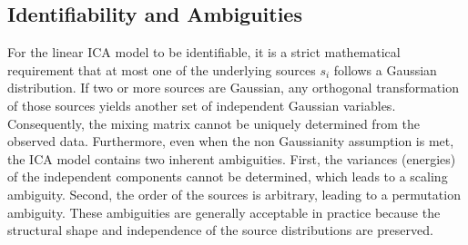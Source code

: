 \documentclass[12pt,a4paper,twoside,openany]{book}
\begin{document}
\subsection{Identifiability and Ambiguities}
For the linear ICA model to be identifiable, it is a strict mathematical requirement that at most one of the underlying sources $s_i$ follows a Gaussian distribution. 
If two or more sources are Gaussian, any orthogonal transformation of those sources yields another set of independent Gaussian variables. Consequently, 
the mixing matrix cannot be uniquely determined from the observed data. Furthermore, even when the non Gaussianity assumption is met, the ICA model contains two inherent ambiguities. 
First, the variances (energies) of the independent components cannot be determined, which leads to a scaling ambiguity. Second, the order of the sources is arbitrary, 
leading to a permutation ambiguity. These ambiguities are generally acceptable in practice because the structural shape and independence of the source distributions are preserved.
\end{document}
